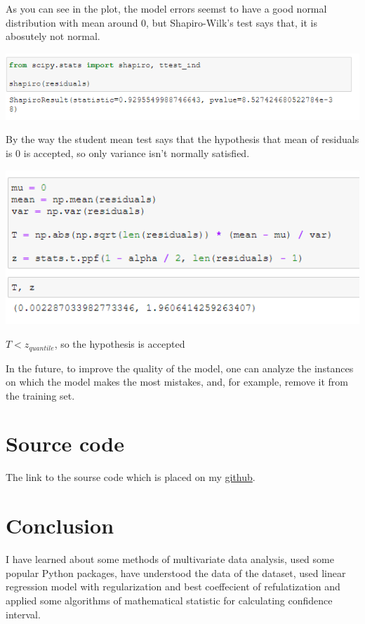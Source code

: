 \documentclass[%
12pt, %
final, %
oneside, %
onecolumn, %
centertags]{article} %
\theoremstyle{plain}
\theoremstyle{definition}
\theoremstyle{remark}
\begin{document}
As you can see in the plot, the model errors seemst to have a good normal distribution with mean around $0$, but Shapiro-Wilk's test says that, it is abosutely not normal. 

\begin{center}
\includegraphics[scale=0.55]{images/shapiro.png}
\end{center}

By the way the student mean test says that the hypothesis that mean of residuals is $0$ is accepted, so only variance isn't normally satisfied.

\begin{center}
\includegraphics[scale=0.55]{images/t.png}

$T < z_{quantile}$, so the hypothesis is accepted
\end{center}

In the future, to improve the quality of the model, one can analyze the instances on which the model makes the most mistakes, and, for example, remove it from the training set.

\section{Source code}

The link to the sourse code which is placed on my \href{https://github.com/aptmess/MMA/}{github}.

\section{Conclusion}

I have learned about some methods of multivariate data analysis, used some popular Python packages, have understood the data of the dataset, used linear regression model with regularization and best coeffecient of refulatization and applied some algorithms of mathematical statistic for calculating confidence interval. 
\end{document}
